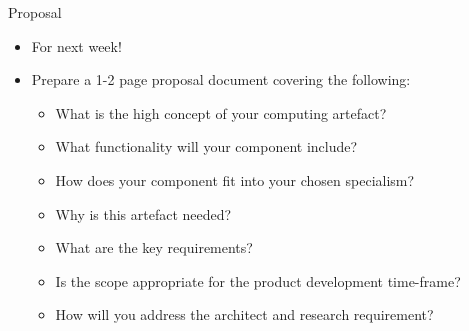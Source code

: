 \begin{frame}{Proposal}
    \begin{itemize}
		\pause\item For next week!
		\pause\item Prepare a 1-2 page proposal document covering the following:
		\begin{itemize}
			\pause\item What is the high concept of your computing artefact?
			\pause\item What functionality will your component include?
			\pause\item How does your component fit into your chosen specialism?
			\pause\item Why is this artefact needed?
			\pause\item What are the key requirements?
			\pause\item Is the scope appropriate for the product development time-frame?
			\pause\item How will you address the architect and research requirement?
		\end{itemize}
	\end{itemize}
\end{frame}
